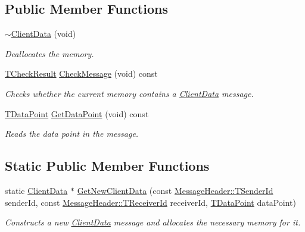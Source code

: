 \subsection*{Public Member Functions}
\begin{DoxyCompactItemize}
\item 
\hyperlink{class_terra_swarm_1_1_synchronous_1_1_client_data_a67bc913ce1ebd9641da07bdc09e4444e}{$\sim$\-Client\-Data} (void)
\begin{DoxyCompactList}\small\item\em Deallocates the memory. \end{DoxyCompactList}\item 
\hyperlink{class_terra_swarm_1_1_synchronous_1_1_client_data_a2a4af9153f7e8fe6cadba6a188ce2207}{T\-Check\-Result} \hyperlink{class_terra_swarm_1_1_synchronous_1_1_client_data_a49c4a96e9b957c237f40aad39e7cb328}{Check\-Message} (void) const 
\begin{DoxyCompactList}\small\item\em Checks whether the current memory contains a \hyperlink{class_terra_swarm_1_1_synchronous_1_1_client_data}{Client\-Data} message. \end{DoxyCompactList}\item 
\hyperlink{class_terra_swarm_1_1_synchronous_1_1_client_data_a6c581f1f80217390ea8fe95136c60f07}{T\-Data\-Point} \hyperlink{class_terra_swarm_1_1_synchronous_1_1_client_data_ac71da8ed6f56cfdac3f01131f6bef342}{Get\-Data\-Point} (void) const 
\begin{DoxyCompactList}\small\item\em Reads the data point in the message. \end{DoxyCompactList}\end{DoxyCompactItemize}
\subsection*{Static Public Member Functions}
\begin{DoxyCompactItemize}
\item 
static \hyperlink{class_terra_swarm_1_1_synchronous_1_1_client_data}{Client\-Data} $\ast$ \hyperlink{class_terra_swarm_1_1_synchronous_1_1_client_data_a5b055348cbcd27e656744b51d98c1ab2}{Get\-New\-Client\-Data} (const \hyperlink{class_terra_swarm_1_1_message_header_a516b36855e2aad7cfbf8770f1b42784f}{Message\-Header\-::\-T\-Sender\-Id} sender\-Id, const \hyperlink{class_terra_swarm_1_1_message_header_aa3260702b182b6f88ddbdd3416e98df0}{Message\-Header\-::\-T\-Receiver\-Id} receiver\-Id, \hyperlink{class_terra_swarm_1_1_synchronous_1_1_client_data_a6c581f1f80217390ea8fe95136c60f07}{T\-Data\-Point} data\-Point)
\begin{DoxyCompactList}\small\item\em Constructs a new \hyperlink{class_terra_swarm_1_1_synchronous_1_1_client_data}{Client\-Data} message and allocates the necessary memory for it. \end{DoxyCompactList}\end{DoxyCompactItemize}
